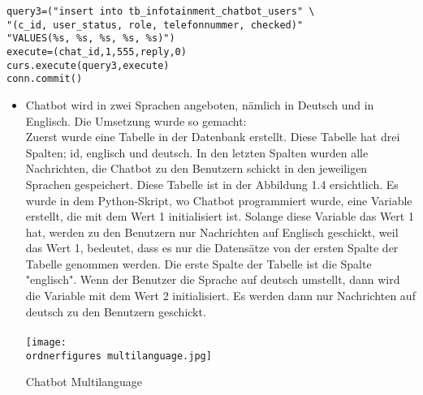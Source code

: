\begin{lstlisting}[frame=single] 
query3=("insert into tb_infotainment_chatbot_users" \
"(c_id, user_status, role, telefonnummer, checked)"
"VALUES(%s, %s, %s, %s, %s)")
execute=(chat_id,1,555,reply,0)
curs.execute(query3,execute)
conn.commit()
\end{lstlisting}
\begin{itemize}
	\item Chatbot wird in zwei Sprachen angeboten, n\"amlich in Deutsch und in Englisch. Die Umsetzung wurde so gemacht: \\
		Zuerst wurde eine Tabelle in der Datenbank erstellt. Diese Tabelle hat drei Spalten; id, englisch und deutsch. In den letzten Spalten wurden alle Nachrichten, die Chatbot zu den Benutzern schickt in den jeweiligen Sprachen gespeichert.	Diese Tabelle ist in der Abbildung 1.4 ersichtlich. 
		Es wurde in dem Python-Skript, wo Chatbot programmiert wurde, eine Variable erstellt, die mit dem Wert 1 initialisiert ist. Solange diese Variable das Wert 1 hat, werden zu den Benutzern nur Nachrichten auf Englisch geschickt, weil das Wert 1, bedeutet, dass es nur die Datens\"atze von der ersten Spalte der Tabelle genommen werden. Die erste Spalte der Tabelle ist die Spalte "englisch". Wenn der Benutzer die Sprache auf deutsch umstellt, dann wird die Variable mit dem Wert 2 initialisiert. Es werden dann nur Nachrichten auf deutsch zu den Benutzern geschickt. \\
		\\
		\captionsetup{type=figure}
		\texttt{[image: \\ordnerfigures multilanguage.jpg]}
		\caption{Chatbot Multilanguage} 
		\label{fig:menudmn}
\end{itemize}
